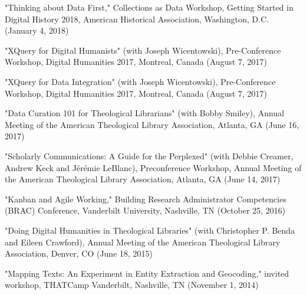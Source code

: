 \documentclass[10pt]{res} %
\begin{document}
\begin{resume}
\begin{hangparas}{.25in}{1}"Thinking about Data First," Collections as Data Workshop, Getting Started in Digital History 2018, American Historical Association, Washington, D.C. (January 4, 2018)\end{hangparas}

\begin{hangparas}{.25in}{1}"XQuery for Digital Humanists" (with Joseph Wicentowski), Pre-Conference Workshop, Digital Humanities 2017, Montreal, Canada (August 7, 2017)\end{hangparas}

\begin{hangparas}{.25in}{1}"XQuery for Data Integration" (with Joseph Wicentowski), Pre-Conference Workshop, Digital Humanities 2017, Montreal, Canada (August 7, 2017)\end{hangparas}

\begin{hangparas}{.25in}{1}"Data Curation 101 for Theological Librarians" (with Bobby Smiley), Annual Meeting of the American Theological Library Association, Atlanta, GA (June 16, 2017)\end{hangparas}

\begin{hangparas}{.25in}{1}"Scholarly Communications: A Guide for the Perplexed" (with Debbie Creamer, Andrew Keck and Jérémie LeBlanc), Preconference Workshop, Annual Meeting of the American Theological Library Association, Atlanta, GA (June 14, 2017)\end{hangparas}

\begin{hangparas}{.25in}{1}"Kanban and Agile Working," Building Research Administrator Competencies (BRAC) Conference, Vanderbilt University, Nashville, TN (October 25, 2016)\end{hangparas}

\begin{hangparas}{.25in}{1}"Doing Digital Humanities in Theological Libraries" (with Christopher P. Benda and Eileen Crawford), Annual Meeting of the American Theological Library Association, Denver, CO (June 18, 2015)\end{hangparas}

\begin{hangparas}{.25in}{1}"Mapping Texts: An Experiment in Entity Extraction and Geocoding," invited workshop, THATCamp Vanderbilt, Nashville, TN (November 1, 2014)\end{hangparas}


\end{resume}
\end{document}
